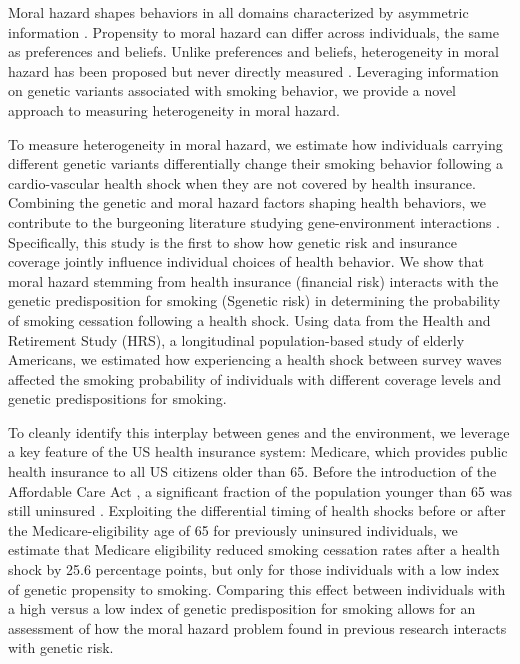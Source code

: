 \documentclass[11pt]{article}
\begin{document}
Moral hazard shapes behaviors in all domains characterized by asymmetric information \citep{Arrow1963,Finkelstein2014}.
Propensity to moral hazard can differ across individuals, the same as preferences and beliefs.
Unlike preferences and beliefs, heterogeneity in moral hazard has been proposed but never directly measured \citep{Einav2013,Dubois2009,Kowalski2018moral}.
Leveraging information on genetic variants associated with smoking behavior, we provide a novel approach to measuring heterogeneity in moral hazard.

To measure heterogeneity in moral hazard, we estimate how individuals carrying different genetic variants differentially change their smoking behavior following a cardio-vascular health shock when they are not covered by health insurance.
Combining the genetic and moral hazard factors shaping health behaviors, we contribute to the burgeoning literature studying gene-environment interactions \citep{Caspi2002,Fletcher2012,Barcellos2018,Belsky2018mobility,Schmitz2017,Schmitz2017vietnam,Wedow2018,Papageorge2020}. %
Specifically, this study is the first to show how genetic risk and insurance coverage jointly influence individual choices of health behavior.
We show that moral hazard stemming from health insurance (financial risk) interacts with the genetic predisposition for smoking (Sgenetic risk) in determining the probability of smoking cessation following a health shock.
Using data from the Health and Retirement Study (HRS), a longitudinal population-based study of elderly Americans, we estimated how experiencing a health shock between survey waves affected the smoking probability of individuals with different coverage levels and genetic predispositions for smoking.

To cleanly identify this interplay between genes and the environment, we leverage a key feature of the US health insurance system: Medicare, which provides public health insurance to all US citizens older than 65.
Before the introduction of the Affordable Care Act \citep{Obama2016}, a significant fraction of the population younger than 65 was still uninsured \citep{Cohen2009,Barnett2016}.
Exploiting the differential timing of health shocks before or after the Medicare-eligibility age of 65 for previously uninsured individuals, we estimate that Medicare eligibility reduced smoking cessation rates after a health shock by 25.6 percentage points, but only for those individuals with a low index of genetic propensity to smoking.
Comparing this effect between individuals with a high versus a low index of genetic predisposition for smoking allows for an assessment of how the moral hazard problem found in previous research interacts with genetic risk.
\end{document}
